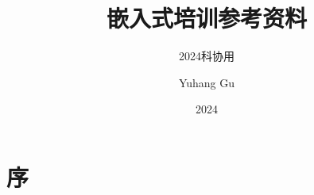 \documentclass[cn,newtx,15pt]{elegantbook}
\title{嵌入式培训参考资料}
\subtitle{2024科协用}
\author{Yuhang Gu}
\date{2024}
\institute{Southeast University, School of Electronics Engineering}
\begin{document}
\maketitle

\frontmatter
\tableofcontents
\newpage

\chapter{序}



\mainmatter




\end{document}
